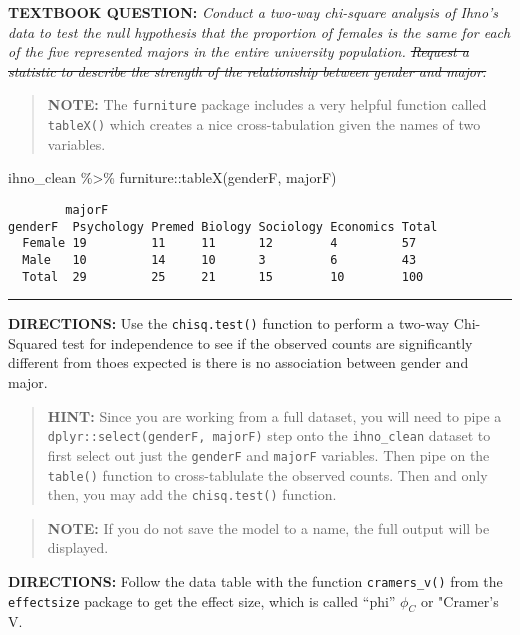 \documentclass[
]{article}
\newenvironment{Shaded}{\begin{snugshade}}{\end{snugshade}}
\newcommand{\FunctionTok}[1]{\textcolor[rgb]{0.00,0.00,0.00}{#1}}
\newcommand{\NormalTok}[1]{#1}
\newcommand{\SpecialCharTok}[1]{\textcolor[rgb]{0.00,0.00,0.00}{#1}}
\begin{document}
\textbf{TEXTBOOK QUESTION:} \emph{Conduct a two-way chi-square analysis
of Ihno's data to test the null hypothesis that the proportion of
females is the same for each of the five represented majors in the
entire university population. \sout{Request a statistic to describe the
strength of the relationship between gender and major.}}

\begin{quote}
\textbf{NOTE:} The \texttt{furniture} package includes a very helpful
function called \texttt{tableX()} which creates a nice cross-tabulation
given the names of two variables.
\end{quote}

\begin{Shaded}
\begin{Highlighting}[]
\NormalTok{ihno\_clean }\SpecialCharTok{\%\textgreater{}\%} 
\NormalTok{  furniture}\SpecialCharTok{::}\FunctionTok{tableX}\NormalTok{(genderF, majorF)}
\end{Highlighting}
\end{Shaded}

\begin{verbatim}
        majorF
genderF  Psychology Premed Biology Sociology Economics Total
  Female 19         11     11      12        4         57   
  Male   10         14     10      3         6         43   
  Total  29         25     21      15        10        100  
\end{verbatim}

\begin{center}\rule{0.5\linewidth}{0.5pt}\end{center}

\textbf{DIRECTIONS:} Use the \texttt{chisq.test()} function to perform a
two-way Chi-Squared test for independence to see if the observed counts
are significantly different from thoes expected is there is no
association between gender and major.

\begin{quote}
\textbf{HINT:} Since you are working from a full dataset, you will need
to pipe a \texttt{dplyr::select(genderF,\ majorF)} step onto the
\texttt{ihno\_clean} dataset to first select out just the
\texttt{genderF} and \texttt{majorF} variables. Then pipe on the
\texttt{table()} function to cross-tablulate the observed counts. Then
and only then, you may add the \texttt{chisq.test()} function.
\end{quote}

\begin{quote}
\textbf{NOTE:} If you do not save the model to a name, the full output
will be displayed.
\end{quote}

\textbf{DIRECTIONS:} Follow the data table with the function
\texttt{cramers\_v()} from the \texttt{effectsize} package to get the
effect size, which is called ``phi'' \(\phi_C\) or "Cramer's V.
\end{document}
